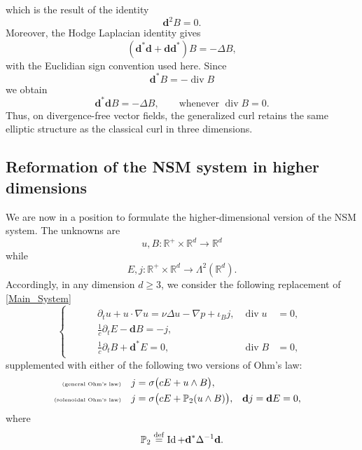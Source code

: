 \documentclass[11pt, leqno, a4paper,]{amsart}
\theoremstyle{remark}
\numberwithin{equation}{section}
\newcommand*{\bydef}{\overset{\rm def}{=}}
\renewcommand*{\div}{\operatorname{div}}
\newcommand*{\id}{\operatorname{Id}}
\begin{document}
which is the result of the identity 
\begin{equation*}
	 \mathbf d^2B=0.
\end{equation*}
Moreover, the Hodge Laplacian identity gives 
\begin{equation*}
	(\mathbf d^*\mathbf d +\mathbf d\mathbf d^*) B= - \Delta B,
\end{equation*}
with the Euclidian sign convention used here. Since 
\begin{equation*}
	\mathbf d^* B=- \div B
\end{equation*}
we obtain
\begin{equation}\label{eq:curl-laplacian}
\textbf{d}^*\textbf{d}B=
-\Delta B,
\qquad
\text{whenever }\operatorname{div}B=0.
\end{equation}
Thus, on divergence-free vector fields, the generalized curl retains the same elliptic structure as the classical curl in three dimensions.
\subsection{Reformation of the NSM system in higher dimensions}
We are now in a position to formulate the higher-dimensional version of the NSM system. The unknowns are
\begin{equation*}
	u,B : \mathbb R^+ \times \mathbb R^d \to \mathbb R^d
\end{equation*}
while 
\begin{equation*}
	E,j : \mathbb R^+ \times \mathbb R^d \to \Lambda^2(\mathbb R^d).
\end{equation*}
Accordingly, in any dimension $d\geq 3$, we consider the following replacement of \eqref{Main_System} 
\begin{equation}\label{eq:NSM-higher-dimensional}
\begin{cases}
\begin{aligned}
&&& \partial_tu+u\cdot\nabla u
=
\nu\Delta u-\nabla p+\iota_Bj,
&
\operatorname{div}u&=0,
\\
 &&&\displaystyle \frac1c\partial_tE-\textbf{d} B = -j, &
 \\
 &&& \displaystyle \frac1c\partial_tB+ \textbf{d} ^*E = 0, & \operatorname{div}B&=0,  \end{aligned} \end{cases} \end{equation}
 supplemented with either of the following two versions of Ohm's law:
 \begin{equation}\label{Ohm:laws:d}
 	\begin{aligned}
 		\text{\tiny(general Ohm's law)}&&&j= \sigma \big( cE + u  \wedge B\big),   
 		\\
 		\text{\tiny(solenoidal Ohm's law)}&&&j= \sigma \big( cE + \mathbb P_2(u \wedge B)\big), & \textbf{d}  j = \textbf{d}  E = 0,&
 	\end{aligned}
 \end{equation}
 where 
 \begin{equation*}
 	\mathbb P_2 \bydef \id + \textbf{d}^* \Delta^{-1} \textbf{d} .
 \end{equation*}
 
\end{document}

